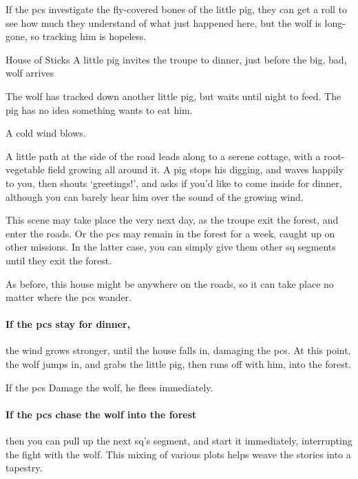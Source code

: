 \begin{multicols}{2}
If the \glspl{pc} investigate the fly-covered bones of the little pig, they can get a roll to see how much they understand of what just happened here, but the wolf is long-gone, so tracking him is hopeless.

{House of Sticks}%
{A little pig invites the troupe to dinner, just before the big, bad, wolf arrives}%

\begin{exampletext}
  The wolf has tracked down another little pig, but waits until night to feed.
  The pig has no idea something wants to eat him.
\end{exampletext}

\begin{boxtext}
  A cold wind blows.

  A little path at the side of the road leads along to a serene cottage, with a root-vegetable field growing all around it.
  A pig stops his digging, and waves happily to you, then shouts `greetings!', and asks if you'd like to come inside for dinner, although you can barely hear him over the sound of the growing wind.
\end{boxtext}

This scene may take place the very next day, as the troupe exit the forest, and enter the roads.
Or the \glspl{pc} may remain in the forest for a week, caught up on other missions.
In the latter case, you can simply give them other \gls{sq} \glspl{segment} until they exit the forest.

As before, this house might be anywhere on the roads, so it can take place no matter where the \glspl{pc} wander.

\paragraph{If the \glspl{pc} stay for dinner,}
the wind grows stronger, until the house falls in, damaging the \glspl{pc}.
At this point, the wolf jumps in, and grabs the little pig, then runs off with him, into the forest.

If the \glspl{pc} Damage the wolf, he flees immediately.

\paragraph{If the \glspl{pc} chase the wolf into the forest}
then you can pull up the next \gls{sq}'s \gls{segment}, and start it immediately, interrupting the fight with the wolf.
This mixing of various plots helps weave the stories into a tapestry.


\end{multicols}

